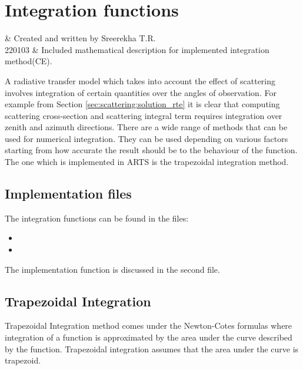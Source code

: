 \chapter{Integration functions}
\label{sec:integration}

 & Created and written by Sreerekha T.R.\\
  220103 & Included mathematical description for implemented integration method(CE).\\
\stophistory

%
%
A radiative transfer model which takes into account the effect of
scattering involves integration of certain quantities over the angles
of observation.  For example from Section
\ref{sec:scattering:solution_rte} it is clear that computing  
scattering cross-section  and scattering integral term requires
integration over zenith and azimuth directions. There are a wide range of
methods that can be used for numerical integration. They can be used
depending on various factors starting from how accurate the result
should be to the behaviour of the function. The one which is
implemented in ARTS is the trapezoidal integration method. 


\section{Implementation files}
\label{sec:integration:files}

The integration functions can be found in the files:
\begin{itemize}
\item {}
\item {}
\end{itemize}
The implementation function is
discussed in the second file. 

\section{Trapezoidal Integration}
\label{sec:integration:trapezoidal}

Trapezoidal Integration method comes under the Newton-Cotes formulas
where integration of a function is approximated by the area under the
curve described by the function.  Trapezoidal integration assumes that
the area under the curve is trapezoid.  

